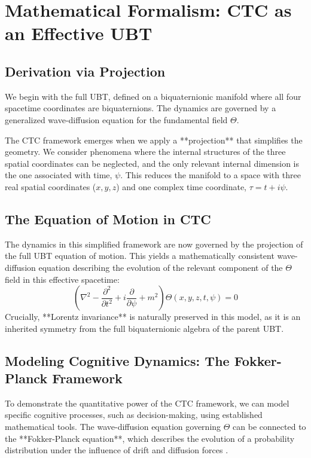 \documentclass[12pt, a4paper]{article}
\begin{document}
\section{Mathematical Formalism: CTC as an Effective UBT}
\subsection{Derivation via Projection}
We begin with the full UBT, defined on a biquaternionic manifold where all four spacetime coordinates are biquaternions. The dynamics are governed by a generalized wave-diffusion equation for the fundamental field \( \Theta \).

The CTC framework emerges when we apply a **projection** that simplifies the geometry. We consider phenomena where the internal structures of the three spatial coordinates can be neglected, and the only relevant internal dimension is the one associated with time, \( \psi \). This reduces the manifold to a space with three real spatial coordinates (\(x, y, z\)) and one complex time coordinate, \( \tau = t + i\psi \).

\subsection{The Equation of Motion in CTC}
The dynamics in this simplified framework are now governed by the projection of the full UBT equation of motion. This yields a mathematically consistent wave-diffusion equation describing the evolution of the relevant component of the \( \Theta \) field in this effective spacetime:
\begin{equation}
    \left( \nabla^2 - \frac{\partial^2}{\partial t^2} + i \frac{\partial}{\partial \psi} + m^2 \right)\Theta(x,y,z,t,\psi) = 0
\end{equation}
Crucially, **Lorentz invariance** is naturally preserved in this model, as it is an inherited symmetry from the full biquaternionic algebra of the parent UBT.

\subsection{Modeling Cognitive Dynamics: The Fokker-Planck Framework}
To demonstrate the quantitative power of the CTC framework, we can model specific cognitive processes, such as decision-making, using established mathematical tools. The wave-diffusion equation governing \( \Theta \) can be connected to the **Fokker-Planck equation**, which describes the evolution of a probability distribution under the influence of drift and diffusion forces \cite{risken1996fokker}.
\end{document}
